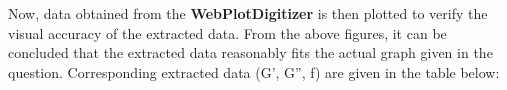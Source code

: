\documentclass[a4paper,12pt]{report}
\begin{document}
\begin{figure}[H]%
    \centering
    \qquad
\end{figure}
\noindent
Now, data obtained from the \textbf{WebPlotDigitizer} is then plotted to verify the visual accuracy of the extracted data. From the above figures, it can be concluded that the extracted data reasonably fits the actual graph given in the question. Corresponding extracted data (G', G'', f) are given in the table  below:
\end{document}
